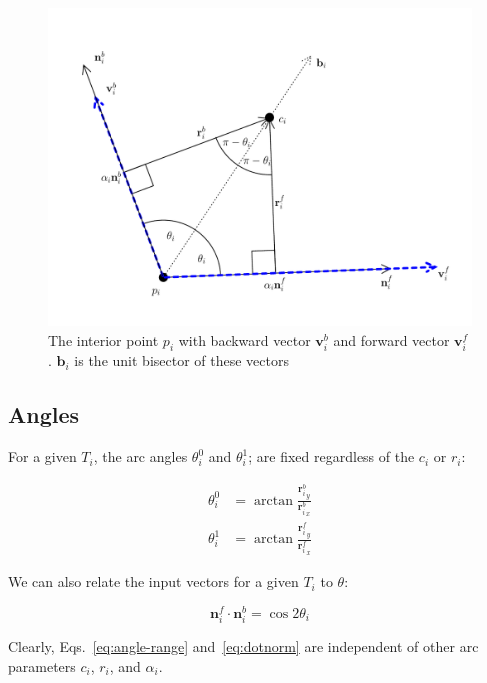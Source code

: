\documentclass{article}
\begin{document}
\begin{figure}[h]
  \centering
  \includegraphics[width=\columnwidth]{4}
  \caption{The interior point $p_{i}$ with backward vector $\mathbf{v}^{b}_{i}$ and forward vector $\mathbf{v}^{f}_{i}$. $\mathbf{b}_{i}$ is the unit bisector of these vectors}
  \label{fig:interior-point}
\end{figure}

\subsection{Angles}

For a given $T_i$, the arc angles $\theta^0_i$ and $\theta^{1}_{i}$; are fixed regardless of the $c_i$ or $r_{i}$:

\begin{equation}
  \label{eq:angle-range}
  \begin{split}
    \theta^{0}_{i} &= \arctan \frac{{\mathbf{r}^{b}_{i}}_{y}}{{\mathbf{r}^{b}_{i}}_{x}}\\
    \theta^{1}_{i} &= \arctan \frac{{\mathbf{r}^{f}_{i}}_{y}}{{\mathbf{r}^{f}_{i}}_{x}}
  \end{split}
\end{equation}

We can also relate the input vectors for a given $T_{i}$ to $\theta$:

\begin{equation}
  \label{eq:dotnorm}
  \mathbf{n}^{f}_{i} \cdot \mathbf{n}^{b}_{i} = \cos 2\theta_i
\end{equation}

Clearly, Eqs.~\eqref{eq:angle-range} and~\eqref{eq:dotnorm} are independent of other arc parameters $c_{i}$, $r_{i}$, and $\alpha_i$.
\end{document}
